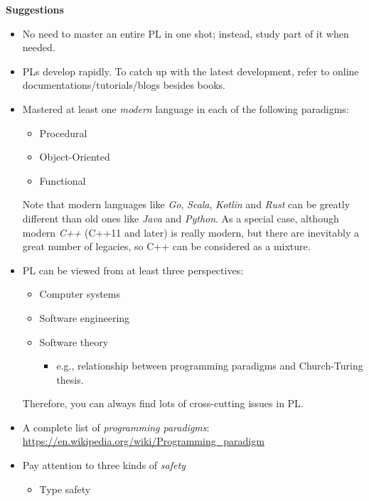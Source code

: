 \documentclass{article}
\begin{document}
    \textbf{Suggestions}
        \begin{itemize}
            \item No need to master an entire PL in one shot; instead, study part of it when needed.
            \item PLs develop rapidly. To catch up with the latest development, refer to online documentations/tutorials/blogs besides books.
            \item Mastered at least one \emph{modern} language in each of the following paradigms:
            \begin{itemize}
                \item Procedural
                \item Object-Oriented
                \item Functional
            \end{itemize}
            Note that modern languages like \emph{Go}, \emph{Scala}, \emph{Kotlin} and \emph{Rust} can be greatly different than old ones like \emph{Java} and \emph{Python}.
            As a special case, although modern \emph{C++} (C++11 and later) is really modern, but there are inevitably a great number of legacies, so C++ can be considered as a mixture.
            \item PL can be viewed from at least three perspectives:
            \begin{itemize}
                \item Computer systems
                \item Software engineering
                \item Software theory
                \begin{itemize}
                    \item e.g., relationship between programming paradigms and Church-Turing thesis.
                \end{itemize}
            \end{itemize}
            Therefore, you can always find lots of cross-cutting issues in PL.
            \item A complete list of \emph{programming paradigms}:\\
            \href{https://en.wikipedia.org/wiki/Programming\_paradigm}{https://en.wikipedia.org/wiki/Programming\_paradigm}
            \item Pay attention to three kinds of \emph{safety}
            \begin{itemize}
                \item Type safety

\end{itemize}
\end{itemize}
\end{document}
